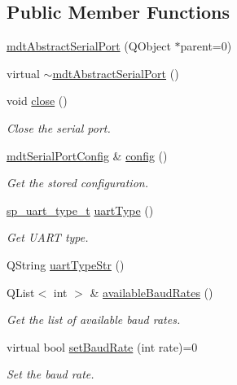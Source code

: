 \subsection*{Public Member Functions}
\begin{DoxyCompactItemize}
\item 
\hyperlink{classmdt_abstract_serial_port_ae379b6151edebc1518e81ec061e379db}{mdt\-Abstract\-Serial\-Port} (Q\-Object $\ast$parent=0)
\item 
virtual \hyperlink{classmdt_abstract_serial_port_af695a8df8e155a938da8e7bd00e34631}{$\sim$mdt\-Abstract\-Serial\-Port} ()
\item 
void \hyperlink{classmdt_abstract_serial_port_ae668910f98ad0e158dc6ebebf0c19805}{close} ()
\begin{DoxyCompactList}\small\item\em Close the serial port. \end{DoxyCompactList}\item 
\hyperlink{classmdt_serial_port_config}{mdt\-Serial\-Port\-Config} \& \hyperlink{classmdt_abstract_serial_port_ae053b73fee897769641813df658c9ead}{config} ()
\begin{DoxyCompactList}\small\item\em Get the stored configuration. \end{DoxyCompactList}\item 
\hyperlink{classmdt_abstract_serial_port_a56b107c57fb0acb17cfcca262abe6a54}{sp\-\_\-uart\-\_\-type\-\_\-t} \hyperlink{classmdt_abstract_serial_port_a6b153155d9e110336d51ec48d2cee203}{uart\-Type} ()
\begin{DoxyCompactList}\small\item\em Get U\-A\-R\-T type. \end{DoxyCompactList}\item 
Q\-String \hyperlink{classmdt_abstract_serial_port_a669c9ce68455abd3cfdb98259996e701}{uart\-Type\-Str} ()
\item 
Q\-List$<$ int $>$ \& \hyperlink{classmdt_abstract_serial_port_aecd76bff0f93cb86c3bbfd73e3776032}{available\-Baud\-Rates} ()
\begin{DoxyCompactList}\small\item\em Get the list of available baud rates. \end{DoxyCompactList}\item 
virtual bool \hyperlink{classmdt_abstract_serial_port_ae250b30c1db5652bd2abe2caf1c9d5c7}{set\-Baud\-Rate} (int rate)=0
\begin{DoxyCompactList}\small\item\em Set the baud rate. \end{DoxyCompactList}\item 

\end{DoxyCompactItemize}
